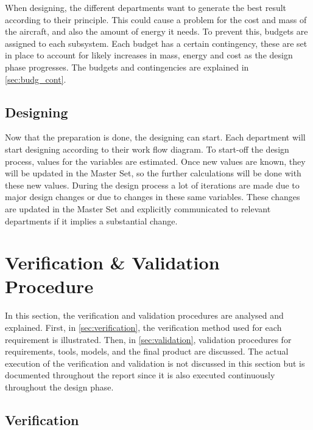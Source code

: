 When designing, the different departments want to generate the best result according to their principle. This could cause a problem for the cost and mass of the aircraft, and also the amount of energy it needs. To prevent this, budgets are assigned to each subsystem. Each budget has a certain contingency, these are set in place to account for likely increases in mass, energy and cost as the design phase progresses. The budgets and contingencies are explained in \autoref{sec:budg_cont}.

\subsection{Designing}

Now that the preparation is done, the designing can start. Each department will start designing according to their work flow diagram. To start-off the design process, values for the variables are estimated. Once new values are known, they will be updated in the Master Set, so the further calculations will be done with these new values. During the design process a lot of iterations are made due to major design changes or due to changes in these same variables. These changes are updated in the Master Set and explicitly communicated to relevant departments if it implies a substantial change.

\section{Verification \& Validation Procedure}
\label{sec:veri_vali_proc}

In this section, the verification and validation procedures are analysed and explained. First, in \autoref{sec:verification}, the verification method used for each requirement is illustrated. Then, in \autoref{sec:validation}, validation procedures for requirements, tools, models, and the final product are discussed. The actual execution of the verification and validation is not discussed in this section but is documented throughout the report since it is also executed continuously throughout the design phase.

\subsection{Verification}%
\label{sec:verification}

